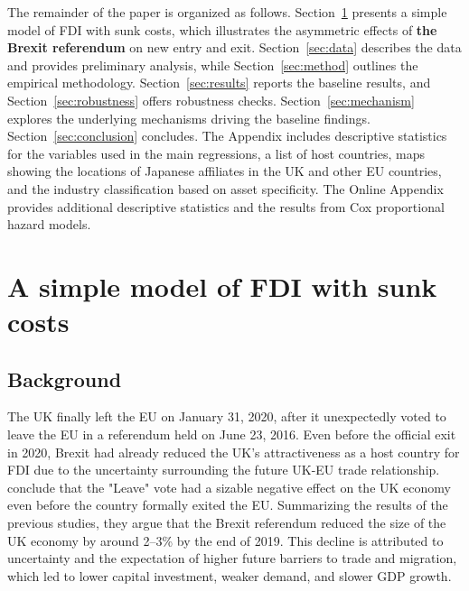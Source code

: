 \documentclass[preprint,11pt,authoryear]{elsarticle}
\begin{document}
The remainder of the paper is organized as follows.
Section~\ref{sec:Model} presents a simple model of FDI with sunk costs, which illustrates the asymmetric effects of \textbf{the Brexit referendum} on new entry and exit. Section~\ref{sec:data} describes the data and provides preliminary analysis, while Section~\ref{sec:method} outlines the empirical methodology. Section~\ref{sec:results} reports the baseline results, and Section~\ref{sec:robustness} offers robustness checks. Section~\ref{sec:mechanism} explores the underlying mechanisms driving the baseline findings. Section~\ref{sec:conclusion} concludes.
The Appendix includes descriptive statistics for the variables used in the main regressions, a list of host countries, maps showing the locations of Japanese affiliates in the UK and other EU countries, and the industry classification based on asset specificity. 
The Online Appendix provides additional descriptive statistics and the results from Cox proportional hazard models.



\section{A simple model of FDI with sunk costs}\label{sec:Model} 

\subsection{Background}

The UK finally left the EU on January 31, 2020, after it unexpectedly voted to leave the EU in a referendum held on June 23, 2016.
Even before the official exit in 2020, Brexit had already reduced the UK's attractiveness as a host country for FDI due to the uncertainty surrounding the future UK-EU trade relationship. 
\cite{dhingra2022expecting} conclude that the "Leave" vote had a sizable negative effect on the UK economy even before the country formally exited the EU. Summarizing the results of the previous studies, they argue that the Brexit referendum reduced the size of the UK economy by around 2--3\% by the end of 2019.
This decline is attributed to uncertainty and the expectation of higher future barriers to trade and migration, which led to lower capital investment, weaker demand, and slower GDP growth.
\end{document}

